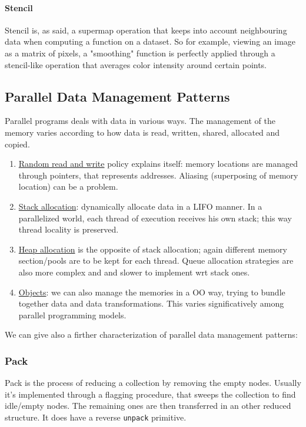 \documentclass{article}
\begin{document}
				\paragraph{Stencil}
					Stencil is, as said, a supermap operation that keeps into account neighbouring data when computing a function on a dataset. So for example, viewing an image as a matrix of pixels, a "smoothing" function is perfectly applied through a stencil-like operation that averages color intensity around certain points.

		\subsection{Parallel Data Management Patterns}
			Parallel programs deals with data in various ways. The management of the memory varies according to how data is read, written, shared, allocated and copied.
			\begin{enumerate}
				\item \underline{Random read and write} policy explains itself: memory locations are managed through pointers, that represents addresses. Aliasing (superposing of memory location) can be a problem.
				\item \underline{Stack allocation}: dynamically allocate data in a LIFO manner. In a parallelized world, each thread of execution receives his own stack; this way thread locality is preserved.
				\item \underline{Heap allocation} is the opposite of stack allocation; again different memory section/pools are to be kept for each thread. Queue allocation strategies are also more complex and and slower to implement wrt stack ones.
				\item \underline{Objects}: we can also manage the memories in a OO way, trying to bundle together data and data transformations. This varies significatively among parallel programming models.
			\end{enumerate}
			We can give also a firther characterization of parallel data management patterns:

			\subsubsection{Pack}
				Pack is the process of reducing a collection by removing the empty nodes. Usually it's implemented through a flagging procedure, that sweeps the collection to find idle/empty nodes. The remaining ones are then transferred in an other reduced structure. It does have a reverse \verb|unpack| primitive.
\end{document}
